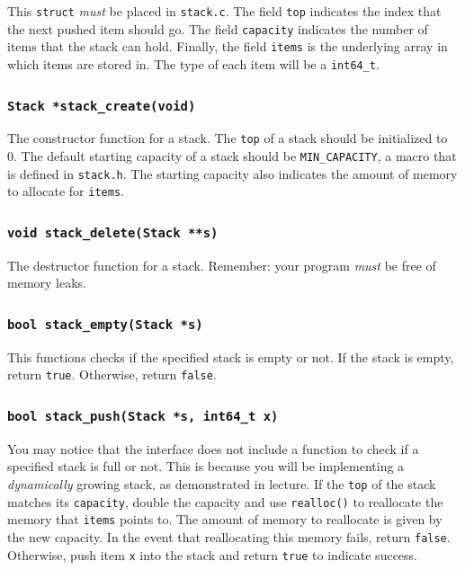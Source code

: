 \documentclass[11pt]{article}
\begin{document}
This \texttt{struct} \emph{must} be placed in \texttt{stack.c}. The
field \texttt{top} indicates the index that the next pushed item
should go. The field \texttt{capacity} indicates the number of items
that the stack can hold. Finally, the field \texttt{items} is the
underlying array in which items are stored in. The type of each item
will be a \texttt{int64\_t}.

\subsubsection{\texttt{Stack *stack\_create(void)}}

The constructor function for a stack. The \texttt{top} of a stack should
be initialized to 0. The default starting capacity of a stack should be
\texttt{MIN\_CAPACITY}, a macro that is defined in \texttt{stack.h}. The
starting capacity also indicates the amount of memory to allocate for
\texttt{items}.

\subsubsection{\texttt{void stack\_delete(Stack **s)}}

The destructor function for a stack. Remember: your program \emph{must}
be free of memory leaks.

\subsubsection{\texttt{bool stack\_empty(Stack *s)}}

This functions checks if the specified stack is empty or not. If the
stack is empty, return \texttt{true}. Otherwise, return \texttt{false}.

\subsubsection{\texttt{bool stack\_push(Stack *s, int64\_t x)}}

You may notice that the interface does not include a function to check
if a specified stack is full or not. This is because you will be
implementing a \emph{dynamically} growing stack, as demonstrated in
lecture. If the \texttt{top} of the stack matches its \texttt{capacity},
double the capacity and use \texttt{realloc()} to reallocate the memory
that \texttt{items} points to. The amount of memory to reallocate is
given by the new capacity. In the event that reallocating this memory
fails, return \texttt{false}. Otherwise, push item \texttt{x} into the
stack and return \texttt{true} to indicate success.
\end{document}
